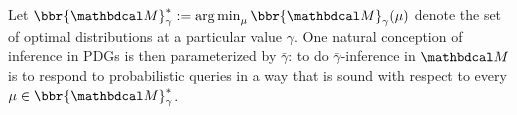 \documentclass{article}
\newcommand\zogamma{{\bar\gamma}}
\begin{document}
Let $\bbr{\dg M}^*_\gamma := \argmin_\mu \bbr{\dg M}_\gamma(\mu)$ denote
the set of optimal distributions at a particular value $\gamma$.
%
%
%
One natural conception of inference in PDGs is then parameterized by
$\zogamma$:
to do $\zogamma$-inference
in $\dg M$ is to respond to probabilistic queries in a way that is sound with respect to every $\mu \in \bbr{\dg M}^*_\gamma$.
\end{document}
